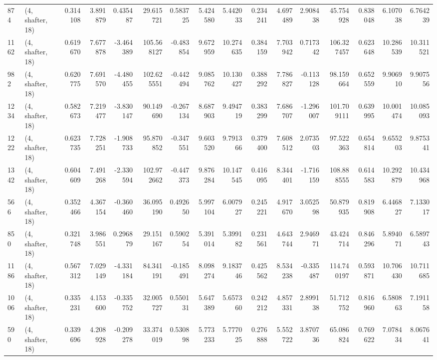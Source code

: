 \begin{tabular}{llrrrrrrrrrrrrrr}
874  &  (4, shafter, 18) &   0.314108 &   3.891879 &   0.435487 &     29.615721 &    0.583725 &    5.424580 &    5.442033 &  0.234241 &   4.697489 &   2.908438 &    45.754928 &   0.838048 &   6.107038 &   6.764239 \\
1162 &  (4, shafter, 18) &   0.619670 &   7.677878 &  -3.464389 &    105.568127 &   -0.483854 &    9.672959 &   10.274635 &  0.384159 &   7.703942 &   0.717342 &   106.327457 &   0.623648 &  10.286539 &  10.311521 \\
982  &  (4, shafter, 18) &   0.620775 &   7.691570 &  -4.480455 &    102.625551 &   -0.442494 &    9.085762 &   10.130427 &  0.388292 &   7.786827 &  -0.113128 &    98.159664 &   0.652559 &   9.906910 &   9.907556 \\
1234 &  (4, shafter, 18) &   0.582673 &   7.219477 &  -3.830147 &     90.149690 &   -0.267134 &    8.687903 &    9.494719 &  0.383299 &   7.686707 &  -1.296007 &   101.709111 &   0.639995 &  10.001474 &  10.085093 \\
1222 &  (4, shafter, 18) &   0.623735 &   7.728251 &  -1.908733 &     95.870852 &   -0.347551 &    9.603520 &    9.791366 &  0.379400 &   7.608512 &   2.073503 &    97.522363 &   0.654814 &   9.655203 &   9.875341 \\
1342 &  (4, shafter, 18) &   0.604609 &   7.491268 &  -2.330594 &    102.972662 &   -0.447373 &    9.876284 &   10.147545 &  0.416095 &   8.344401 &  -1.716159 &   108.888555 &   0.614583 &  10.292879 &  10.434968 \\
566  &  (4, shafter, 18) &   0.352466 &   4.367154 &  -0.360460 &     36.095190 &    0.492650 &    5.997104 &    6.007927 &  0.245221 &   4.917670 &   3.052598 &    50.879935 &   0.819908 &   6.446827 &   7.133017 \\
850  &  (4, shafter, 18) &   0.321748 &   3.986551 &   0.296879 &     29.151167 &    0.590254 &    5.391014 &    5.399182 &  0.231561 &   4.643744 &   2.946971 &    43.424714 &   0.846296 &   5.894071 &   6.589743 \\
1186 &  (4, shafter, 18) &   0.567312 &   7.029149 &  -4.331184 &     84.341191 &   -0.185491 &    8.098274 &    9.183746 &  0.425562 &   8.534238 &  -0.335487 &   114.740197 &   0.593871 &  10.706430 &  10.711685 \\
1006 &  (4, shafter, 18) &   0.335231 &   4.153600 &  -0.335752 &     32.005727 &    0.550131 &    5.647389 &    5.657360 &  0.242212 &   4.857331 &   2.899138 &    51.712752 &   0.816960 &   6.580863 &   7.191158 \\
590  &  (4, shafter, 18) &   0.339696 &   4.208928 &  -0.209278 &     33.374019 &    0.530898 &    5.773233 &    5.777025 &  0.276888 &   5.552722 &   3.870736 &    65.086824 &   0.769622 &   7.078434 &   8.067641 \\

\end{tabular}
